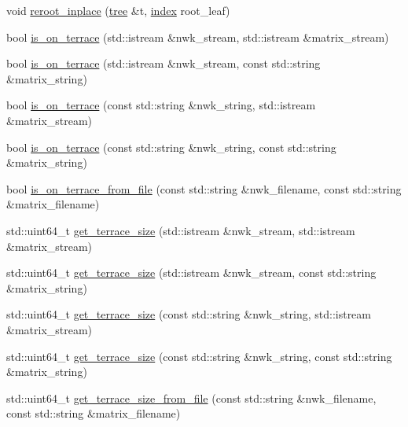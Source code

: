 \begin{DoxyCompactItemize}
\item 
void \hyperlink{namespaceterraces_ae8abab19d1c4a35eb187cd2cf005fe59}{reroot\+\_\+inplace} (\hyperlink{namespaceterraces_a07aaf7feec4a22c6cdefc14c5a81bdd0}{tree} \&t, \hyperlink{namespaceterraces_adbc33ccb543d1634e96d0eb02e472c77}{index} root\+\_\+leaf)
\item 
bool \hyperlink{namespaceterraces_a924744ce1ce711e40d0cf722d551e375}{is\+\_\+on\+\_\+terrace} (std\+::istream \&nwk\+\_\+stream, std\+::istream \&matrix\+\_\+stream)
\item 
bool \hyperlink{namespaceterraces_a4e75afae24e5c7fef4f9b22ea3ee9486}{is\+\_\+on\+\_\+terrace} (std\+::istream \&nwk\+\_\+stream, const std\+::string \&matrix\+\_\+string)
\item 
bool \hyperlink{namespaceterraces_aaa1cfc0f0adeee6408adaf1049c24227}{is\+\_\+on\+\_\+terrace} (const std\+::string \&nwk\+\_\+string, std\+::istream \&matrix\+\_\+stream)
\item 
bool \hyperlink{namespaceterraces_a2dd57bda3af31246492ad52438015b42}{is\+\_\+on\+\_\+terrace} (const std\+::string \&nwk\+\_\+string, const std\+::string \&matrix\+\_\+string)
\item 
bool \hyperlink{namespaceterraces_afadd08934abd0d298e2b36c7025e4565}{is\+\_\+on\+\_\+terrace\+\_\+from\+\_\+file} (const std\+::string \&nwk\+\_\+filename, const std\+::string \&matrix\+\_\+filename)
\item 
std\+::uint64\+\_\+t \hyperlink{namespaceterraces_a7ef22320b680e0859629f36e6366095b}{get\+\_\+terrace\+\_\+size} (std\+::istream \&nwk\+\_\+stream, std\+::istream \&matrix\+\_\+stream)
\item 
std\+::uint64\+\_\+t \hyperlink{namespaceterraces_a3d63d1aacb79fba0eec3047276257247}{get\+\_\+terrace\+\_\+size} (std\+::istream \&nwk\+\_\+stream, const std\+::string \&matrix\+\_\+string)
\item 
std\+::uint64\+\_\+t \hyperlink{namespaceterraces_a134fb35cc9c3ade97715eaef710ee458}{get\+\_\+terrace\+\_\+size} (const std\+::string \&nwk\+\_\+string, std\+::istream \&matrix\+\_\+stream)
\item 
std\+::uint64\+\_\+t \hyperlink{namespaceterraces_a42c8925377cdc643dffb08a08cb76c6b}{get\+\_\+terrace\+\_\+size} (const std\+::string \&nwk\+\_\+string, const std\+::string \&matrix\+\_\+string)
\item 
std\+::uint64\+\_\+t \hyperlink{namespaceterraces_a56e02226b324a2c6c7620ed31be10971}{get\+\_\+terrace\+\_\+size\+\_\+from\+\_\+file} (const std\+::string \&nwk\+\_\+filename, const std\+::string \&matrix\+\_\+filename)

\end{DoxyCompactItemize}
